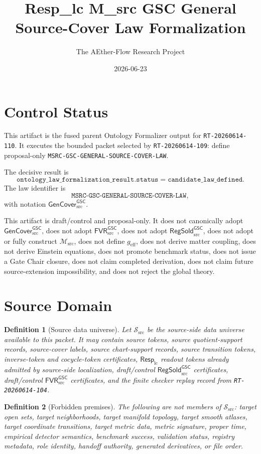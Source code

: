 \documentclass[11pt]{article}
\title{Resp\_lc M\_src GSC General Source-Cover Law Formalization}
\author{The AEther-Flow Research Project}
\date{2026-06-23}
\newcommand{\RespLC}{\mathsf{Resp}_{\mathrm{lc}}}
\newcommand{\Msrc}{\mathcal{M}_{\mathrm{src}}}
\newcommand{\geff}{g_{\mathrm{eff}}}
\newcommand{\RegSold}{\mathsf{RegSold}_{\mathrm{src}}^{\mathsf{GSC}}}
\newcommand{\FVRSrc}{\mathsf{FVR}_{\mathrm{src}}^{\mathsf{GSC}}}
\newcommand{\GenCover}{\mathsf{GenCover}_{\mathrm{src}}^{\mathsf{GSC}}}
\newtheorem{definition}{Definition}
\begin{document}
\maketitle

\section*{Control Status}

This artifact is the fused parent Ontology Formalizer output for
\texttt{RT-20260614-110}. It executes the bounded packet selected by
\texttt{RT-20260614-109}: define proposal-only
\texttt{MSRC-GSC-GENERAL-SOURCE-COVER-LAW}.

The decisive result is
\[
  \texttt{ontology\_law\_formalization\_result.status}
  =
  \texttt{candidate\_law\_defined}.
\]
The law identifier is
\[
  \texttt{MSRC-GSC-GENERAL-SOURCE-COVER-LAW},
\]
with notation \(\GenCover\).

This artifact is draft/control and proposal-only. It does not canonically
adopt \(\GenCover\), does not adopt \(\FVRSrc\), does not adopt
\(\RegSold\), does not adopt or fully construct \(\Msrc\), does not define
\(\geff\), does not derive matter coupling, does not derive Einstein
equations, does not promote benchmark status, does not issue a Gate Chair
closure, does not claim completed derivation, does not claim future
source-extension impossibility, and does not reject the global theory.

\section{Source Domain}

\begin{definition}[Source data universe]
Let \(\mathcal{S}_{\mathrm{src}}\) be the source-side data universe available
to this packet. It may contain source tokens, source quotient-support records,
source-cover labels, source chart-support records, source transition tokens,
inverse-token and cocycle-token certificates, \(\RespLC\) readout tokens
already admitted by source-side localization, draft/control \(\RegSold\)
certificates, draft/control \(\FVRSrc\) certificates, and the finite checker
replay record from \texttt{RT-20260614-104}.
\end{definition}

\begin{definition}[Forbidden premises]
The following are not members of \(\mathcal{S}_{\mathrm{src}}\): target open
sets, target neighborhoods, target manifold topology, target smooth atlases,
target coordinate transitions, target metric data, metric signature, proper
time, empirical detector semantics, benchmark success, validation status,
registry metadata, role identity, handoff authority, generated derivatives,
or file order.
\end{definition}
\end{document}

